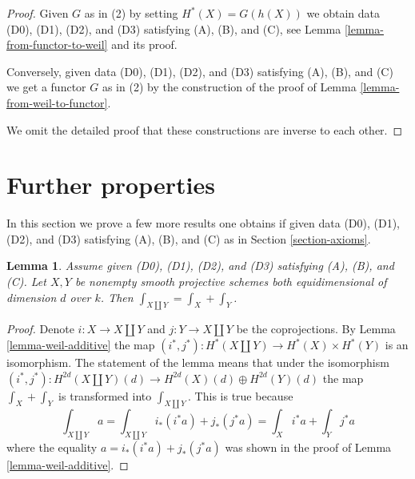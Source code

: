 \documentclass{stacks-project}
\theoremstyle{plain}
\newtheorem{lemma}[subsection]{Lemma}
\theoremstyle{definition}
\theoremstyle{remark}
\numberwithin{equation}{subsection}
\begin{document}
\begin{proof}
Given $G$ as in (2) by setting $H^*(X) = G(h(X))$ we obtain data
(D0), (D1), (D2), and (D3) satisfying (A), (B), and (C),
see Lemma \ref{lemma-from-functor-to-weil} and its proof.

\medskip\noindent
Conversely, given data (D0), (D1), (D2), and (D3)
satisfying (A), (B), and (C) we get a functor $G$ as in (2)
by the construction of the proof of Lemma \ref{lemma-from-weil-to-functor}.

\medskip\noindent
We omit the detailed proof that these constructions are inverse
to each other.
\end{proof}











\section{Further properties}
\label{section-further}

\noindent
In this section we prove a few more results one obtains if
given data (D0), (D1), (D2), and (D3) satisfying (A), (B), and (C) as in
Section \ref{section-axioms}.

\begin{lemma}
\label{lemma-trace-disjoint-union}
Assume given (D0), (D1), (D2), and (D3) satisfying (A), (B), and (C).
Let $X, Y$ be nonempty smooth projective schemes both equidimensional
of dimension $d$ over $k$. Then $\int_{X \amalg Y} = \int_X + \int_Y$.
\end{lemma}

\begin{proof}
Denote $i : X \to X \amalg Y$ and $j : Y \to X \amalg Y$ be the coprojections.
By Lemma \ref{lemma-weil-additive} the map
$(i^*, j^*) : H^*(X \amalg Y) \to H^*(X) \times H^*(Y)$ is an isomorphism.
The statement of the lemma means that under the isomorphism
$(i^*, j^*) : H^{2d}(X \amalg Y)(d) \to H^{2d}(X)(d) \oplus H^{2d}(Y)(d)$
the map $\int_X + \int_Y$ is transformed into $\int_{X \amalg Y}$.
This is true because
$$
\int_{X \amalg Y} a =
\int_{X \amalg Y} i_*(i^*a) + j_*(j^*a) =
\int_X i^*a + \int_Y j^*a
$$
where the equality $a = i_*(i^*a) + j_*(j^*a)$ was shown in
the proof of Lemma \ref{lemma-weil-additive}.
\end{proof}
\end{document}

